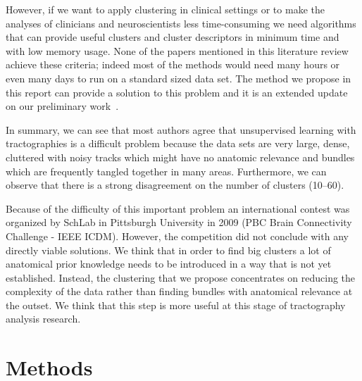 \documentclass[preprint,authoryear,a4paper,10pt,onecolumn]{elsarticle}
\begin{document}
However, if we want to apply clustering in clinical settings or to make
the analyses of clinicians and neuroscientists less time-consuming we need
algorithms that can provide useful clusters and cluster descriptors in
minimum time and with low memory usage. None of the papers mentioned in
this literature review achieve these criteria; indeed most of the
methods would need many hours or even many days to run on a standard
sized data set. The method we propose in this report can provide a
solution to this problem and it is an extended update on our
preliminary work~\citep{EGMB10}.


In summary, we can see that most authors agree that unsupervised
learning with tractographies is a difficult problem because the data
sets are very large, dense, cluttered with noisy tracks which might have
no anatomic relevance and bundles which are frequently tangled together
in many areas. Furthermore, we can observe that there is a strong
disagreement on the number of clusters (\numrange{10}{60}).

Because of the difficulty of this important problem an international contest was
organized by SchLab in Pittsburgh University in 2009 (PBC Brain
Connectivity Challenge - IEEE ICDM). However, the competition
did not conclude with any directly viable solutions. We think that in
order to find big clusters a lot of anatomical prior knowledge needs to
be introduced in a way that is not yet established. Instead, the
clustering that we propose concentrates on reducing the complexity of
the data rather than finding bundles with anatomical relevance at the
outset. We think that this step is more useful at this stage of
tractography analysis research.

\section{Methods}


\end{document}

